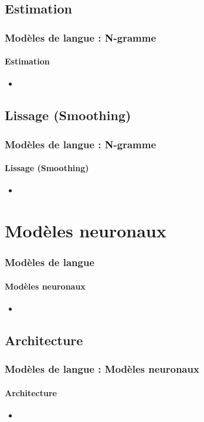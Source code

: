 \documentclass[xcolor=table]{beamer}
\begin{document}
\subsection{Estimation}

\begin{frame}
\frametitle{Modèles de langue : N-gramme}
\framesubtitle{Estimation}

\begin{itemize}
	\item 
\end{itemize}

\end{frame}

\subsection{Lissage (Smoothing)}

\begin{frame}
\frametitle{Modèles de langue : N-gramme}
\framesubtitle{Lissage (Smoothing)}

\begin{itemize}
	\item 
\end{itemize}

\end{frame}


\section{Modèles neuronaux}

\begin{frame}
\frametitle{Modèles de langue}
\framesubtitle{Modèles neuronaux}

\begin{itemize}
	\item 
\end{itemize}

\end{frame}

\subsection{Architecture}

\begin{frame}
\frametitle{Modèles de langue : Modèles neuronaux}
\framesubtitle{Architecture}

\begin{itemize}
	\item 
\end{itemize}

\end{frame}
\end{document}
